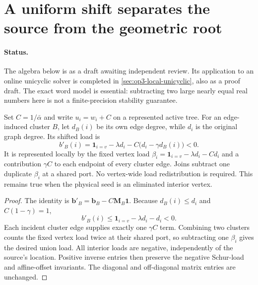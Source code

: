 \section[Uniform shift and geometric root]{A uniform shift separates the source from the geometric root}
\label{sec:op3-shifted-tree-clusters}

\paragraph{Status.}
The algebra below is \statusproved{} as a draft awaiting independent review.
Its application to an online unicyclic solver is completed in
\cref{sec:op3-local-unicyclic}, also as a proof draft.
The exact word model is essential: subtracting two large nearly equal real
numbers here is not a finite-precision stability guarantee.

\begin{lemma}
\label{lem:op3-uniform-negative-shift}
Set $C=1/\bar\alpha$ and write $u_i=w_i+C$ on a represented active tree.
For an edge-induced cluster $B$, let $d_B(i)$ be its own edge degree, while
$d_i$ is the original graph degree. Its shifted load is
\begin{equation}
 b'_B(i)=\mathbf1_{i=v}-\lambda d_i-C\bigl(d_i-\gamma d_B(i)\bigr)<0.
 \label{eq:op3-shifted-cluster-load}
\end{equation}
It is represented locally by the fixed vertex load
$\beta_i=\mathbf1_{i=v}-\lambda d_i-Cd_i$ and a contribution $\gamma C$
to each endpoint of every cluster edge. Joins subtract one duplicate
$\beta_i$ at a shared port. No vertex-wide load redistribution is required.
This remains true when the physical seed is an eliminated interior vertex.
\end{lemma}
\begin{proof}
The identity is $\boldsymbol b'_B=\boldsymbol b_B-C\boldsymbol M_B\boldsymbol1$.
Because $d_B(i)\leq d_i$ and $C(1-\gamma)=1$,
\[
 b'_B(i)\leq\mathbf1_{i=v}-\lambda d_i-d_i<0.
\]
Each incident cluster edge supplies exactly one $\gamma C$ term. Combining
two clusters counts the fixed vertex load twice at their shared port, so
subtracting one $\beta_i$ gives the desired union load. All interior loads
are negative, independently of the source's location. Positive inverse
entries then preserve the negative Schur-load and affine-offset invariants.
The diagonal and off-diagonal matrix entries are unchanged.
\end{proof}


